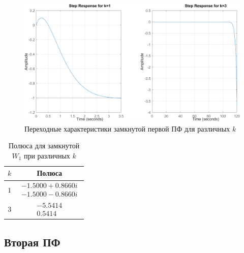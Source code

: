 \begin{figure}[H]
    \centering
    \includegraphics[width=\textwidth]{figs/task_2_W1_ksteps.png}
    \caption{Переходные характеристики замкнутой первой ПФ для различных $k$}
    \label{fig:W1_step}
\end{figure}

\begin{table}[H]
    \centering
    \caption{Полюса для замкнутой $W_1$ при различных $k$}
    \begin{tabular}{|c|c|}
        \hline
        $k$ & Полюса \\ \hline
        $1$ & $\begin{matrix}
            -1.5000 + 0.8660i \\ -1.5000 - 0.8660i
        \end{matrix}$ \\ \hline
        $3$ & $\begin{matrix}
            -5.5414 \\ 0.5414
        \end{matrix}$ \\ \hline
    \end{tabular}
    \label{tab:W1clopolse}
\end{table}

\subsection{Вторая ПФ}

